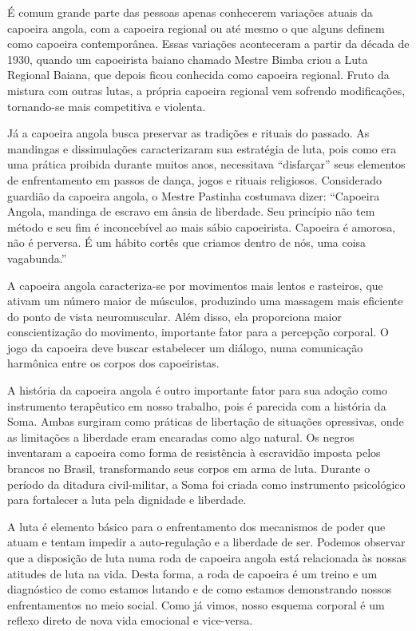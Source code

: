 É comum grande parte das pessoas apenas conhecerem variações atuais da
capoeira angola, com a capoeira regional ou até mesmo o que alguns
definem como capoeira contemporânea. Essas variações aconteceram a
partir da década de 1930, quando um capoeirista baiano chamado Mestre
Bimba criou a Luta Regional Baiana, que depois ficou conhecida como
capoeira regional. Fruto da mistura com outras lutas, a própria capoeira
regional vem sofrendo modificações, tornando-se mais competitiva e
violenta.

Já a capoeira angola busca preservar as tradições e rituais do passado.
As mandingas e dissimulações caracterizaram sua estratégia de luta, pois
como era uma prática proibida durante muitos anos, necessitava
``disfarçar'' seus elementos de enfrentamento em passos de dança, jogos
e rituais religiosos. Considerado guardião da capoeira angola, o Mestre
Pastinha costumava dizer: ``Capoeira Angola, mandinga de escravo em
ânsia de liberdade. Seu princípio não tem método e seu fim é
inconcebível ao mais sábio capoeirista. Capoeira é amorosa, não é
perversa. É um hábito cortês que criamos dentro de nós, uma coisa
vagabunda.''

A capoeira angola caracteriza-se por movimentos mais lentos e rasteiros,
que ativam um número maior de músculos, produzindo uma massagem mais
eficiente do ponto de vista neuromuscular. Além disso, ela proporciona
maior conscientização do movimento, importante fator para a percepção
corporal. O jogo da capoeira deve buscar estabelecer um diálogo, numa
comunicação harmônica entre os corpos dos capoeiristas.

A história da capoeira angola é outro importante fator para sua adoção
como instrumento terapêutico em nosso trabalho, pois é parecida com a
história da Soma. Ambas surgiram como práticas de libertação de
situações opressivas, onde as limitações a liberdade eram encaradas como
algo natural. Os negros inventaram a capoeira como forma de resistência
à escravidão imposta pelos brancos no Brasil, transformando seus corpos
em arma de luta. Durante o período da ditadura civil-militar, a Soma foi
criada como instrumento psicológico para fortalecer a luta pela
dignidade e liberdade.

A luta é elemento básico para o enfrentamento dos mecanismos de poder
que atuam e tentam impedir a auto-regulação e a liberdade de ser.
Podemos observar que a disposição de luta numa roda de capoeira angola
está relacionada às nossas atitudes de luta na vida. Desta forma, a roda
de capoeira é um treino e um diagnóstico de como estamos lutando e de
como estamos demonstrando nossos enfrentamentos no meio social. Como já
vimos, nosso esquema corporal é um reflexo direto de nova vida emocional
e vice-versa.

